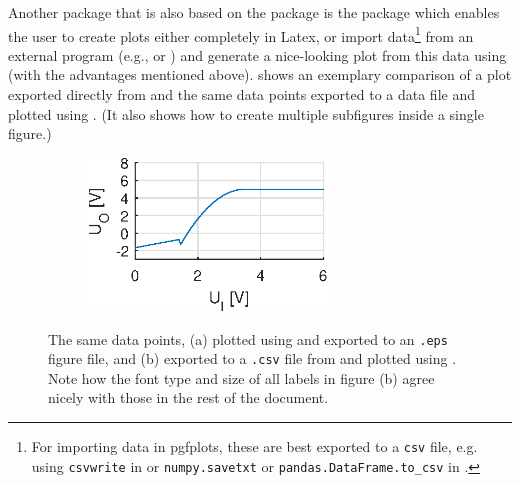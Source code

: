 Another package that is also based on the  package is the \pgfplots{} package which enables the user to create plots either completely in Latex, or import data\footnote{For importing data in pgfplots, these are best exported to a \texttt{csv} file, e.g. using \texttt{csvwrite} in \matlab{} or \texttt{numpy.savetxt} or \texttt{pandas.DataFrame.to\_csv} in \python{}.} from an external program (e.g., \matlab{} or \python{}) and generate a nice-looking plot from this data using  (with the advantages mentioned above).
 shows an exemplary comparison of a plot exported directly from \matlab{} and the same data points exported to a data file and plotted using \pgfplots{}.
(It also shows how to create multiple subfigures inside a single figure.)
\begin{figure}[htbp]
	\centering
	\begin{subfigure}[t]{.5\textwidth}
		\centering
		\includegraphics[width=2.5in]{figures/generated/ex2.eps}
		\caption{}
	\end{subfigure}%
	\begin{subfigure}[t]{.5\textwidth}
		\caption{}
	\end{subfigure}
	\caption[This is the short caption for the Matlab figure that appears in the list of figures]{The same data points, (a) plotted using \matlab{} and exported to an \texttt{.eps} figure file, and (b) exported to a \texttt{.csv} file from \matlab{} and plotted using \pgfplots{}.
	Note how the font type and size of all labels in figure (b) agree nicely with those in the rest of the document.}
	\label{fig:matlab}
\end{figure}
